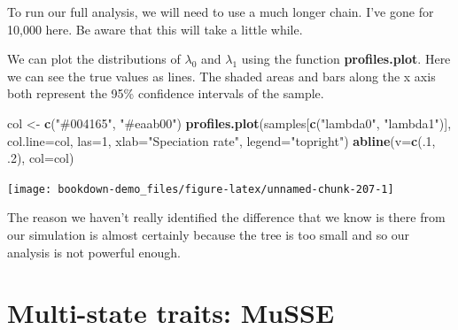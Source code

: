 \documentclass[
]{book}
\newenvironment{Shaded}{\begin{snugshade}}{\end{snugshade}}
\newcommand{\DataTypeTok}[1]{\textcolor[rgb]{0.13,0.29,0.53}{#1}}
\newcommand{\DecValTok}[1]{\textcolor[rgb]{0.00,0.00,0.81}{#1}}
\newcommand{\FloatTok}[1]{\textcolor[rgb]{0.00,0.00,0.81}{#1}}
\newcommand{\KeywordTok}[1]{\textcolor[rgb]{0.13,0.29,0.53}{\textbf{#1}}}
\newcommand{\NormalTok}[1]{#1}
\newcommand{\OperatorTok}[1]{\textcolor[rgb]{0.81,0.36,0.00}{\textbf{#1}}}
\newcommand{\StringTok}[1]{\textcolor[rgb]{0.31,0.60,0.02}{#1}}
\begin{document}
To run our full analysis, we will need to use a much longer chain. I've gone for 10,000 here. Be aware that this will take a little while.

\begin{Shaded}
\end{Shaded}

We can plot the distributions of \(\lambda_{0}\) and \(\lambda_{1}\) using the function \textbf{profiles.plot}. Here we can see the true values as lines. The shaded areas and bars along the x axis both represent the 95\% confidence intervals of the sample.

\begin{Shaded}
\begin{Highlighting}[]
\NormalTok{col \textless{}{-}}\StringTok{ }\KeywordTok{c}\NormalTok{(}\StringTok{"\#004165"}\NormalTok{, }\StringTok{"\#eaab00"}\NormalTok{)}
\KeywordTok{profiles.plot}\NormalTok{(samples[}\KeywordTok{c}\NormalTok{(}\StringTok{"lambda0"}\NormalTok{, }\StringTok{"lambda1"}\NormalTok{)], }\DataTypeTok{col.line=}\NormalTok{col, }\DataTypeTok{las=}\DecValTok{1}\NormalTok{,}
              \DataTypeTok{xlab=}\StringTok{"Speciation rate"}\NormalTok{, }\DataTypeTok{legend=}\StringTok{"topright"}\NormalTok{)}
\KeywordTok{abline}\NormalTok{(}\DataTypeTok{v=}\KeywordTok{c}\NormalTok{(.}\DecValTok{1}\NormalTok{, }\FloatTok{.2}\NormalTok{), }\DataTypeTok{col=}\NormalTok{col)}
\end{Highlighting}
\end{Shaded}

\begin{center}\texttt{[image: bookdown-demo\_files/figure-latex/unnamed-chunk-207-1]} \end{center}

The reason we haven't really identified the difference that we know is there from our simulation is almost certainly because the tree is too small and so our analysis is not powerful enough.

\hypertarget{multi-state-traits-musse}{%
\section{Multi-state traits: MuSSE}\label{multi-state-traits-musse}}
\end{document}
